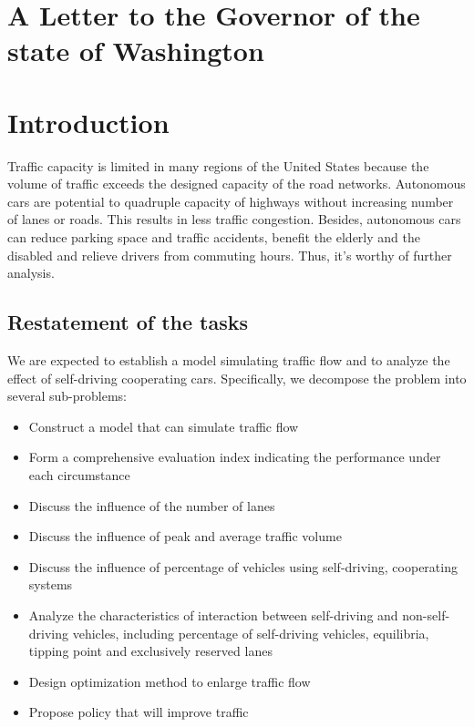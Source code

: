 \documentclass[a4paper]{article}
\begin{document}
	\section{A Letter to the Governor of the state of Washington}

	\newpage
	\tableofcontents
	\newpage

	\section{Introduction}
	Traffic capacity is limited in many regions of the United States because the volume of traffic exceeds the designed capacity of the road networks. Autonomous cars are potential to quadruple capacity of highways without increasing number of lanes or roads. This results in less traffic congestion. Besides, autonomous cars can reduce parking space and traffic accidents, benefit the elderly and the disabled and relieve drivers from commuting hours. Thus, it’s worthy of further analysis.

	\subsection{Restatement of the tasks}
	We are expected to establish a model simulating traffic flow and to analyze the effect of self-driving cooperating cars. Specifically, we decompose the problem into several sub-problems:
	\begin{itemize}
		\item Construct a model that can simulate traffic flow
		\item Form a comprehensive evaluation index indicating the performance under each circumstance
		\item Discuss the influence of the number of lanes
		\item Discuss the influence of peak and average traffic volume
		\item Discuss the influence of percentage of vehicles using self-driving, cooperating systems
		\item Analyze the characteristics of interaction between self-driving and non-self-driving vehicles, including percentage of self-driving vehicles, equilibria, tipping point and exclusively reserved lanes
		\item Design optimization method to enlarge traffic flow
		\item Propose policy that will improve traffic
	\end{itemize}
\end{document}
